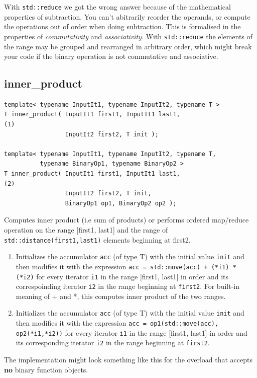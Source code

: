 \documentclass{report}
\begin{document}
\bigbreak \noindent
With \texttt{std::reduce} we got the wrong answer because of the mathematical properties of subtraction. You can't abitrarily reorder the operands, or compute the operations out of order when doing subtraction. This is formalised in the properties of \textit{commutativity} and \textit{associativity}.
\bigbreak \noindent
With \texttt{std::reduce} the elements of the range may be grouped and rearranged in arbitrary order, which might break your code if the binary operation is not commutative and associative. 
\subsection{inner\_product}
\begin{verbatim}
template< typename InputIt1, typename InputIt2, typename T >
T inner_product( InputIt1 first1, InputIt1 last1,                         (1)
                 InputIt2 first2, T init );

template< typename InputIt1, typename InputIt2, typename T,
          typename BinaryOp1, typename BinaryOp2 >
T inner_product( InputIt1 first1, InputIt1 last1,                         (2) 
                 InputIt2 first2, T init, 
                 BinaryOp1 op1, BinaryOp2 op2 );
\end{verbatim}
\noindent Computes inner product (i.e sum of products) or performs ordered map/reduce operation on the range [first1, last1] and the range of \texttt{std::distance(first1,last1)} elements beginning at first2.
\begin{enumerate}
    \item Initializes the accumulator \texttt{acc} (of type T) with the initial value \texttt{init} and then modifies it with the expression \texttt{acc = std::move(acc) + (*i1) * (*i2)} for every iterator \texttt{i1} in the range [first1, last1] in order and its correspoinding iterator \texttt{i2} in the range beginning at \texttt{first2}. For built-in meaning of + and *, this computes inner product of the two ranges.
    \item Initializes the accumulator \texttt{acc} (of type T) with the initial value \texttt{init} and then modifies it with the expression \texttt{acc = op1(std::move(acc), op2(*i1,*i2))} for every iterator \texttt{i1} in the range [first1, last1] in order and its corresponding iterator \texttt{i2} in the range beginning at \texttt{first2}.
\end{enumerate}
The implementation might look something like this for the overload that accepts \textbf{no} binary function objects.
\end{document}
